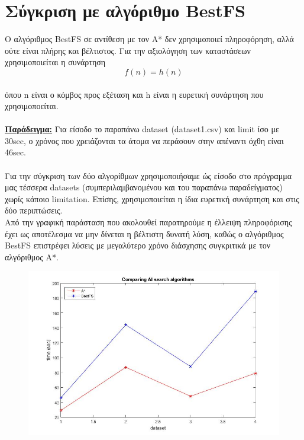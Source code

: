 \documentclass[12pt]{article}
\begin{document}
\section*{Σύγκριση με αλγόριθμο BestFS}
Ο αλγόριθμος BestFS σε αντίθεση με τον A* δεν χρησιμοποιεί πληροφόρηση, αλλά ούτε είναι πλήρης και βέλτιστος.  Για την αξιολόγηση των καταστάσεων χρησιμοποιείται η συνάρτηση
 \begin{equation*}
        f(n) = h(n)
\end{equation*}\\
όπου n είναι ο κόμβος προς εξέταση και h είναι η ευρετική συνάρτηση που χρησιμοποείται.\\\\
\textbf{\underline{Παράδειγμα:}} Για είσοδο το παραπάνω dataset (dataset1.csv) και limit ίσο με 30sec, ο χρόνος που χρειάζονται τα άτομα να περάσουν στην απέναντι όχθη είναι 46sec.\\\\
Για την σύγκριση των δύο αλγορίθμων χρησιμοποιήσαμε ώς είσοδο στο πρόγραμμα μας τέσσερα datasets (συμπεριλαμβανομένου και του παραπάνω παραδείγματος) χωρίς κάποιο limitation. Επίσης, χρησιμοποιείται η ίδια ευρετική συνάρτηση και στις δύο περιπτώσεις.\\
Από την γραφική παράσταση που ακολουθεί παρατηρούμε η έλλειψη πληροφόρισης έχει ως αποτέλεσμα να μην δίνεται η βέλτιστη δυνατή λύση, καθώς ο αλγόριθμος BestFS επιστρέφει λύσεις με μεγαλύτερο χρόνο διάσχησης συγκριτικά με τον αλγόριθμος Α*.
\begin{figure}[H]
        \centering
        \includegraphics[scale=.7]{images/ai_res}
     \end{figure}
\end{document}
